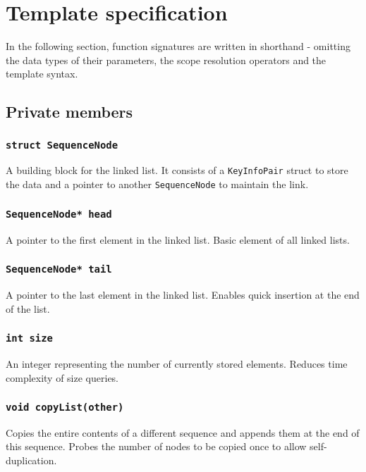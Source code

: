 ﻿\documentclass{article}
\begin{document}
\section{Template specification}

In the following section, function signatures are written in shorthand - omitting
the data types of their parameters, the scope resolution operators and the template syntax.

\subsection{Private members}

\subsubsection{{\tt struct SequenceNode}}

A building block for the linked list. It consists of a {\tt KeyInfoPair} struct to store
the data and a pointer to another {\tt SequenceNode} to maintain the link.

\subsubsection{{\tt SequenceNode* head}}

A pointer to the first element in the linked list. Basic element of all linked lists.

\subsubsection{{\tt SequenceNode* tail}}

A pointer to the last element in the linked list. Enables quick insertion at the end of the list.

\subsubsection{{\tt int size}}

An integer representing the number of currently stored elements. Reduces time complexity
of size queries.

\subsubsection{{\tt void copyList(other)}}

Copies the entire contents of a different sequence and appends them at the end of this
sequence. Probes the number of nodes to be copied once to allow self-duplication.
\end{document}
